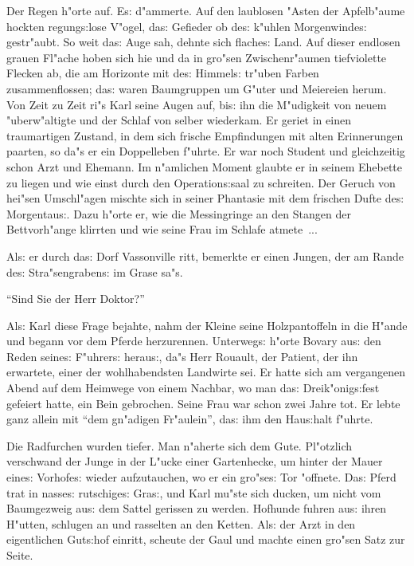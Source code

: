 \documentclass[oneside,12pt]{book}
\newcommand{\s}{s:}%
\begin{document}
Der Regen h"orte auf. E{\s} d"ammerte. Auf den laublosen "Asten
der Apfelb"aume hockten regung{\s}lose V"ogel, da{\s} Gefieder ob
de{\s} k"uhlen Morgenwinde{\s} gestr"aubt. So weit da{\s} Auge
sah, dehnte sich flache{\s} Land. Auf dieser endlosen grauen
Fl"ache hoben sich hie und da in gro"sen Zwischenr"aumen
tiefviolette Flecken ab, die am Horizonte mit de{\s} Himmel{\s}
tr"uben Farben zusammenflossen; da{\s} waren Baumgruppen um G"uter
und Meiereien herum. Von Zeit zu Zeit ri"s Karl seine Augen auf,
bi{\s} ihn die M"udigkeit von neuem "uberw"altigte und der Schlaf
von selber wiederkam. Er geriet in einen traumartigen Zustand, in
dem sich frische Empfindungen mit alten Erinnerungen paarten, so
da"s er ein Doppelleben f"uhrte. Er war noch Student und
gleichzeitig schon Arzt und Ehemann. Im n"amlichen Moment glaubte
er in seinem Ehebette zu liegen und wie einst durch den
Operation{\s}saal zu schreiten. Der Geruch von hei"sen Umschl"agen
mischte sich in seiner Phantasie mit dem frischen Dufte de{\s}
Morgentau{\s}. Dazu h"orte er, wie die Messingringe an den Stangen
der Bettvorh"ange klirrten und wie seine Frau im Schlafe atmete~...

Al{\s} er durch da{\s} Dorf Vassonville ritt, bemerkte er einen
Jungen, der am Rande de{\s} Stra"sengraben{\s} im Grase sa"s.

"`Sind Sie der Herr Doktor?"'

Al{\s} Karl diese Frage bejahte, nahm der Kleine seine
Holzpantoffeln in die H"ande und begann vor dem Pferde
herzurennen. Unterweg{\s} h"orte Bovary au{\s} den Reden seine{\s}
F"uhrer{\s} herau{\s}, da"s Herr Rouault, der Patient, der ihn
erwartete, einer der wohlhabendsten Landwirte sei. Er hatte sich
am vergangenen Abend auf dem Heimwege von einem Nachbar, wo man
da{\s} Dreik"onig{\s}fest gefeiert hatte, ein Bein gebrochen.
Seine Frau war schon zwei Jahre tot. Er lebte ganz allein mit
"`dem gn"adigen Fr"aulein"', da{\s} ihm den Hau{\s}halt f"uhrte.

Die Radfurchen wurden tiefer. Man n"aherte sich dem Gute.
Pl"otzlich verschwand der Junge in der L"ucke einer Gartenhecke,
um hinter der Mauer eine{\s} Vorhofe{\s} wieder aufzutauchen, wo
er ein gro"se{\s} Tor "offnete. Da{\s} Pferd trat in nasse{\s}
rutschige{\s} Gra{\s}, und Karl mu"ste sich ducken, um nicht vom
Baumgezweig au{\s} dem Sattel gerissen zu werden. Hofhunde fuhren
au{\s} ihren H"utten, schlugen an und rasselten an den Ketten.
Al{\s} der Arzt in den eigentlichen Gut{\s}hof einritt, scheute
der Gaul und machte einen gro"sen Satz zur Seite.
\end{document}
